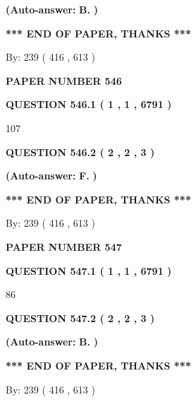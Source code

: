 \documentclass[12pt]{article}
\begin{document}
 
{\textbf{(Auto-answer:}}
{\textbf{\large{
B.}}}
{\textbf{)}}
 
 
   
   
   
   
\vspace{1.0in} 
{\textbf{\large{ *** END OF PAPER, THANKS *** }}} 
   
   
\hspace{1.0in} By: 
 239 ( 416 ,  613 )
   
   
   
   
\newpage 
\setcounter{page}{ 
   546001 } 
   
   
 {\textbf{ \Large{ PAPER NUMBER  546  }}}
   
   
   
   
  
  
{\textbf{\large{QUESTION
546.1 
 ( 1 , 1 , 6791 )
}}}

107
  
  
{\textbf{\large{QUESTION
546.2 
 ( 2 , 2 , 3 )
}}}
 
 
{\textbf{(Auto-answer:}}
{\textbf{\large{
F.}}}
{\textbf{)}}
 
 
   
   
   
   
\vspace{1.0in} 
{\textbf{\large{ *** END OF PAPER, THANKS *** }}} 
   
   
\hspace{1.0in} By: 
 239 ( 416 ,  613 )
   
   
   
   
\newpage 
\setcounter{page}{ 
   547001 } 
   
   
 {\textbf{ \Large{ PAPER NUMBER  547  }}}
   
   
   
   
  
  
{\textbf{\large{QUESTION
547.1 
 ( 1 , 1 , 6791 )
}}}

86
  
  
{\textbf{\large{QUESTION
547.2 
 ( 2 , 2 , 3 )
}}}
 
 
{\textbf{(Auto-answer:}}
{\textbf{\large{
B.}}}
{\textbf{)}}
 
 
   
   
   
   
\vspace{1.0in} 
{\textbf{\large{ *** END OF PAPER, THANKS *** }}} 
   
   
\hspace{1.0in} By: 
 239 ( 416 ,  613 )
   
   
   
\end{document}
